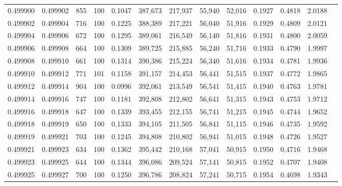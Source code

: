 \begin{tabular}{rrrrrrrrrrrrr}
0.499900 & 0.499902 &   855 & 100 &                                     0.1047 & 387,673 & 217,937 &  55,940 &  52,016 & 0.1927 & 0.4818 & 2.0188 \\
0.499902 & 0.499904 &   716 & 100 &                                     0.1225 & 388,389 & 217,221 &  56,040 &  51,916 & 0.1929 & 0.4809 & 2.0121 \\
0.499904 & 0.499906 &   672 & 100 &                                     0.1295 & 389,061 & 216,549 &  56,140 &  51,816 & 0.1931 & 0.4800 & 2.0059 \\
0.499906 & 0.499908 &   664 & 100 &                                     0.1309 & 389,725 & 215,885 &  56,240 &  51,716 & 0.1933 & 0.4790 & 1.9997 \\
0.499908 & 0.499910 &   661 & 100 &                                     0.1314 & 390,386 & 215,224 &  56,340 &  51,616 & 0.1934 & 0.4781 & 1.9936 \\
0.499910 & 0.499912 &   771 & 101 &                                     0.1158 & 391,157 & 214,453 &  56,441 &  51,515 & 0.1937 & 0.4772 & 1.9865 \\
0.499912 & 0.499914 &   904 & 100 &                                     0.0996 & 392,061 & 213,549 &  56,541 &  51,415 & 0.1940 & 0.4763 & 1.9781 \\
0.499914 & 0.499916 &   747 & 100 &                                     0.1181 & 392,808 & 212,802 &  56,641 &  51,315 & 0.1943 & 0.4753 & 1.9712 \\
0.499916 & 0.499918 &   647 & 100 &                                     0.1339 & 393,455 & 212,155 &  56,741 &  51,215 & 0.1945 & 0.4744 & 1.9652 \\
0.499918 & 0.499919 &   650 & 100 &                                     0.1333 & 394,105 & 211,505 &  56,841 &  51,115 & 0.1946 & 0.4735 & 1.9592 \\
0.499919 & 0.499921 &   703 & 100 &                                     0.1245 & 394,808 & 210,802 &  56,941 &  51,015 & 0.1948 & 0.4726 & 1.9527 \\
0.499921 & 0.499923 &   634 & 100 &                                     0.1362 & 395,442 & 210,168 &  57,041 &  50,915 & 0.1950 & 0.4716 & 1.9468 \\
0.499923 & 0.499925 &   644 & 100 &                                     0.1344 & 396,086 & 209,524 &  57,141 &  50,815 & 0.1952 & 0.4707 & 1.9408 \\
0.499925 & 0.499927 &   700 & 100 &                                     0.1250 & 396,786 & 208,824 &  57,241 &  50,715 & 0.1954 & 0.4698 & 1.9343 \\

\end{tabular}

